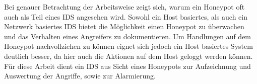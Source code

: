 Bei genauer Betrachtung der Arbeitsweise zeigt sich, warum ein Honeypot oft auch als Teil eines IDS angesehen wird. Sowohl ein Host basiertes, als auch ein Netzwerk basiertes IDS bietet die Möglichkeit einen Honeypot zu überwachen und das Verhalten eines Angreifers zu dokumentieren. Um Handlungen auf dem Honeypot nachvollziehen zu können eignet sich jedoch ein Host basiertes System deutlich besser, da hier auch die Aktionen auf dem Host geloggt werden können. Für diese Arbeit dient ein IDS aus Sicht eines Honeypots zur Aufzeichnung und Auswertung der Angriffe, sowie zur Alarmierung. 